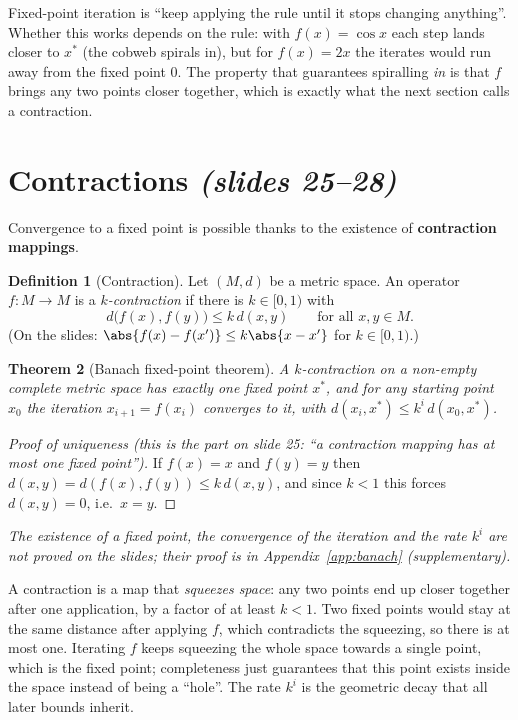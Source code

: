 \documentclass[11pt,a4paper]{article}
\newcommand{\slides}[1]{\emph{(slides #1)}}
\theoremstyle{plain}
\newtheorem{theorem}{Theorem}[section]
\theoremstyle{definition}
\newtheorem{definition}[theorem]{Definition}
\theoremstyle{remark}
\begin{document}
\begin{intuition}
Fixed-point iteration is ``keep applying the rule until it stops changing anything''. Whether this works depends on the rule: with $f(x)=\cos x$ each step lands closer to $x^*$ (the cobweb spirals in), but for $f(x)=2x$ the iterates would run away from the fixed point $0$. The property that guarantees spiralling \emph{in} is that $f$ brings any two points closer together, which is exactly what the next section calls a contraction.
\end{intuition}
\section{Contractions \slides{25--28}}\label{sec:contr}
Convergence to a fixed point is possible thanks to the existence of \textbf{contraction mappings}.

\begin{definition}[Contraction]\label{def:contraction}
Let $(M,d)$ be a metric space. An operator $f:M\to M$ is a \emph{$k$-contraction} if there is $k\in[0,1)$ with
\[
d\big(f(x),f(y)\big)\le k\,d(x,y)\qquad\text{for all }x,y\in M .
\]
(On the slides: $\abs{f(x)-f(x')}\le k\abs{x-x'}$ for $k\in[0,1)$.)
\end{definition}

\begin{theorem}[Banach fixed-point theorem]\label{thm:banach}
A $k$-contraction on a non-empty \emph{complete} metric space has \emph{exactly one} fixed point $x^*$, and for any starting point $x_0$ the iteration $x_{i+1}=f(x_i)$ converges to it, with $d(x_i,x^*)\le k^i\,d(x_0,x^*)$.
\end{theorem}
\begin{proof}[Proof of uniqueness (this is the part on slide 25: ``a contraction mapping has at most one fixed point'')]
If $f(x)=x$ and $f(y)=y$ then $d(x,y)=d(f(x),f(y))\le k\,d(x,y)$, and since $k<1$ this forces $d(x,y)=0$, i.e.\ $x=y$.
\end{proof}
\emph{The existence of a fixed point, the convergence of the iteration and the rate $k^i$ are not proved on the slides; their proof is in Appendix~\ref{app:banach} (supplementary).}

\begin{intuition}
A contraction is a map that \emph{squeezes space}: any two points end up closer together after one application, by a factor of at least $k<1$. Two fixed points would stay at the same distance after applying $f$, which contradicts the squeezing, so there is at most one. Iterating $f$ keeps squeezing the whole space towards a single point, which is the fixed point; completeness just guarantees that this point exists inside the space instead of being a ``hole''. The rate $k^i$ is the geometric decay that all later bounds inherit.
\end{intuition}
\end{document}
